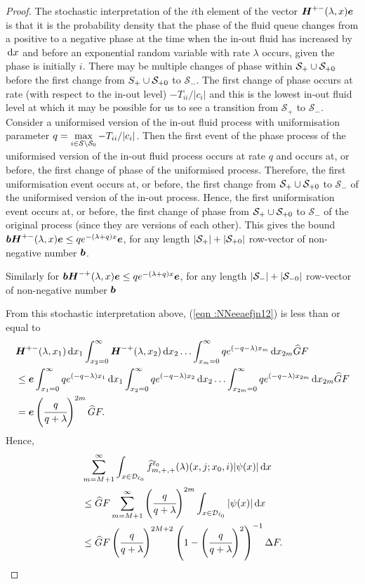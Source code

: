 \begin{proof}
	The stochastic interpretation of the \(i\)th element of the vector \(\boldsymbol H^{+-}(\lambda,x)\boldsymbol e\) is that it is the probability density that the phase of the fluid queue changes from a positive to a negative phase at the time when the in-out fluid has increased by \(\, \mathrm{d} x\) and before an exponential random variable with rate \(\lambda\) occurs, given the phase is initially \(i\). There may be multiple changes of phase within \(\mathcal S_+\cup\mathcal{S}_{+0}\) before the first change from \(\mathcal \mathcal S_+\cup\mathcal{S}_{+0}\) to \(\mathcal S_-\). The first change of phase occurs at rate (with respect to the in-out level) \(-T_{ii}/|c_i|\) and this is the lowest in-out fluid level at which it may be possible for us to see a transition from \(\mathcal S_+\) to \(\mathcal S_-\). Consider a uniformised version of the in-out fluid process with uniformisation parameter \(q = \max\limits_{i\in\mathcal S\setminus \mathcal{S}_0}-T_{ii}/|c_i|\). Then the first event of the phase process of the uniformised version of the in-out fluid process occurs at rate \(q\) and occurs at, or before, the first change of phase of the uniformised process. Therefore, the first uniformisation event occurs at, or before, the first change from \(\mathcal S_+\cup\mathcal{S}_{+0}\) to \(\mathcal S_-\) of the uniformised version of the in-out process. Hence, the first uniformisation event occurs at, or before, the first change of phase from \(\mathcal S_+\cup\mathcal{S}_{+0}\) to \(\mathcal S_-\) of the original process (since they are versions of each other). This gives the bound \(\boldsymbol b\boldsymbol H^{+-}(\lambda,x)\boldsymbol e\leq qe^{-(\lambda + q)x}\boldsymbol e\), for any length \(|\mathcal{S}_+|+|\mathcal{S}_{+0}|\) row-vector of non-negative number \(\boldsymbol b\).
	
	Similarly for \(\boldsymbol b\boldsymbol H^{-+}(\lambda,x)\boldsymbol e\leq qe^{-(\lambda + q)x}\boldsymbol e\), for any length \(|\mathcal{S}_-|+|\mathcal{S}_{-0}|\) row-vector of non-negative number \(\boldsymbol b\)
	
	From this stochastic interpretation above, (\ref{eqn :NNeeaefjn12}) is less than or equal to 
	\begin{align}
	&\boldsymbol H^{+-}(\lambda,x_1) \, \mathrm{d} x_1 \int_{x_2=0}^\infty \boldsymbol H^{-+}(\lambda,x_2)  \, \mathrm{d} x_2  
				\hdots \int_{x_m=0}^\infty qe^{(-q-\lambda)x_m}\, \mathrm{d} x_{2m}\widehat GF\nonumber
	\\&\leq \boldsymbol e\int_{x_1=0}^\infty qe^{(-q-\lambda)x_1}  \, \mathrm{d} x_1 \int_{x_2=0}^\infty qe^{(-q-\lambda)x_2}  \, \mathrm{d} x_2  
				\hdots \int_{x_{2m}=0}^\infty qe^{(-q-\lambda)x_{2m}}\, \mathrm{d} x_{2m}\widehat GF \nonumber
	\\&= \boldsymbol e\left(\cfrac{q}{q+\lambda}\right)^{2m}\widehat GF.\label{eqn: bound ggggaaaa}
	\end{align}
	Hence,  
	\begin{align}
			&\sum_{m=M+1}^\infty \int_{x\in\mathcal{D}_{\ell_0}} \widehat f^{\ell_0}_{m,+,+}(\lambda)(x,j;x_0,i)|\psi(x)|\, \mathrm{d} x \nonumber
		\\&\leq  \widehat GF  \sum_{m=M+1}^\infty \left(\cfrac{q}{q+\lambda}\right)^{2m}\int_{x\in\mathcal{D}_{\ell_0}} |\psi(x)|\, \mathrm{d} x \nonumber
		\\&\leq \widehat GF \left(\cfrac{q}{q+\lambda}\right)^{2M+2} \left(1-\left(\cfrac{q}{q+\lambda}\right)^2\right)^{-1} \Delta F.
	\end{align}
	

\end{proof}
